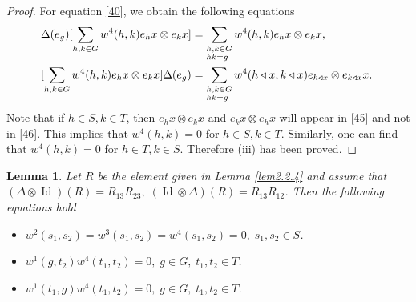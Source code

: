 \documentclass[a4paper,11pt]{amsart}
\def \Id{\operatorname{Id}}
\numberwithin{equation}{section}
\newtheorem{lemma}[theorem]{Lemma}
\begin{document}
\begin{proof}
 For  equation \eqref{40}, we obtain the following equations
 \begin{align}
  \Delta(e_g) [\sum\limits_{h,k \in G}w^4(h,k)e_{h}x \otimes e_{k}x]&=\sum\limits_{\begin{subarray}{l}  h,k \in G  \\
                             hk=g  \\
        \end{subarray}}w^4(h,k)e_{h}x \otimes e_{k}x,\   \label{45} \\
  [\sum\limits_{h,k \in G}w^4(h,k)e_{h}x \otimes e_{k}x] \Delta(e_g)&=\sum\limits_{\begin{subarray}{l}  h,k \in G   \\
                             hk=g  \\
        \end{subarray}}w^4(h \triangleleft x,k \triangleleft x)e_{h \triangleleft x} \otimes e_{k \triangleleft x}x.\    \label{46}
\end{align}
Note that if $h \in S,k\in T$, then $e_{h}x \otimes e_{k}x$ and $e_{k}x \otimes e_{h}x$ will appear in \eqref{45} and not in \eqref{46}. This implies that $w^4(h,k)=0$ for $h \in S,k\in T$. Similarly, one can find that $w^4(h,k)=0$ for $h \in T,k\in S$. Therefore (iii) has been proved.
\end{proof}
\begin{lemma}\label{lem2.2.5}
 Let $R$ be the element given in Lemma \ref{lem2.2.4} and assume that $(\Delta \otimes \Id)(R)=R_{13}R_{23},\;(\Id \otimes \Delta)(R)=R_{13}R_{12}$. Then the following equations hold
\begin{itemize}
  \item[(i)] \label{H} $w^2(s_1,s_2)=w^3(s_1,s_2)=w^4(s_1,s_2)=0,\; s_1,s_2\in S$.
  \item[(ii)] \label{K} $w^1(g,t_2)w^4(t_1,t_2)=0,\; g\in G,\;t_1,t_2 \in T$.
  \item[(iii)] \label{L} $w^1(t_1,g)w^4(t_1,t_2)=0,\; g \in G,\;t_1,t_2 \in T$.
\end{itemize}
\end{lemma}
\end{document}
